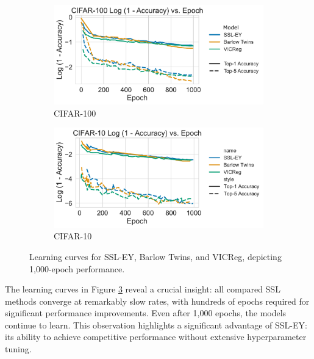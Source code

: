\begin{figure}[H]
    \begin{subfigure}[b]{0.48\textwidth}
        \centering
        \includegraphics[width=\textwidth]{figures/SSL/cifar100_learning_curve_log_error}
        \caption{CIFAR-100}
        \label{fig:ssl_learning_curve_cifar100}
    \end{subfigure}
    \hfill
    \begin{subfigure}[b]{0.48\textwidth}
        \centering
        \includegraphics[width=\textwidth]{figures/SSL/cifar10_learning_curve_log_error}
        \caption{CIFAR-10}
        \label{fig:ssl_learning_curve_cifar10}
    \end{subfigure}
    \caption{Learning curves for SSL-EY, Barlow Twins, and VICReg, depicting 1,000-epoch performance.}
    \label{fig:ssl_learning_curve}
\end{figure}

The learning curves in Figure \ref{fig:ssl_learning_curve} reveal a crucial insight: all compared SSL methods converge at remarkably slow rates, with hundreds of epochs required for significant performance improvements. Even after 1,000 epochs, the models continue to learn. This observation highlights a significant advantage of SSL-EY: its ability to achieve competitive performance without extensive hyperparameter tuning.

